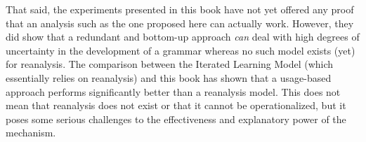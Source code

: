 That said, the experiments presented in this book have not yet offered any proof that an analysis such as the one proposed here can actually work. However, they did show that a redundant and bottom-up approach {\em can} deal with high degrees of uncertainty in the development of a grammar whereas no such model exists (yet) for reanalysis. The comparison between the Iterated Learning Model (which essentially relies on reanalysis) and this book has shown that a usage-based approach performs significantly better than a reanalysis model. This does not mean that reanalysis does not exist or that it cannot be operationalized, but it poses some serious challenges to the effectiveness and explanatory power of the mechanism.
